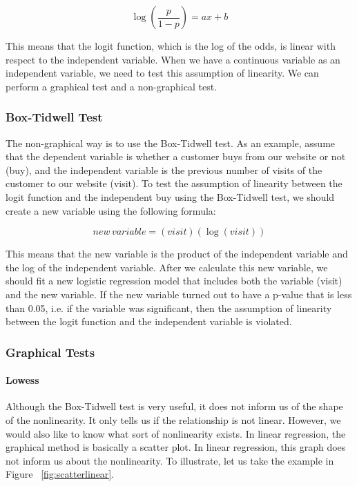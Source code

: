 \documentclass[a4paper,12pt,oneside]{book}
\begin{document}
$$ \log(\frac{p}{1-p})=ax+b $$

This means that the logit function, which is the log of the odds, is linear with respect to the independent variable. When we have a continuous variable as an independent variable, we need to test this assumption of 
linearity. We can perform a graphical test and a non-graphical test.
\subsubsection{Box-Tidwell Test}
The non-graphical way is to use the Box-Tidwell test. As an example, assume that the dependent variable is whether a customer buys from our website or not (buy), and the independent variable is the previous 
number of visits of the customer to our website (visit). To test the assumption of linearity between the logit function and the independent buy using the Box-Tidwell test, we should create a new variable using the 
following formula:

$$ new\, variable=(visit)(\log(visit)) $$

This means that the new variable is the product of the independent variable and the log of the independent variable. After we calculate this new variable, we should fit a new logistic regression model that 
includes both the variable (visit) and the new variable. If the new variable turned out to have a p-value that is less than 0.05, i.e. if the variable was significant, then the assumption of linearity between 
the logit function and the independent variable is violated.
\subsubsection{Graphical Tests}
\paragraph{Lowess}
Although the Box-Tidwell test is very useful, it does not inform us of the shape of the nonlinearity. It only tells us if the relationship is not linear. However, we would also like to know what sort of 
nonlinearity exists. In linear regression, the graphical method is basically a scatter plot. In linear regression, this graph does not inform us about the nonlinearity. To illustrate, let us take the example in 
Figure ~\ref{fig:scatterlinear}.
 
\end{document}
